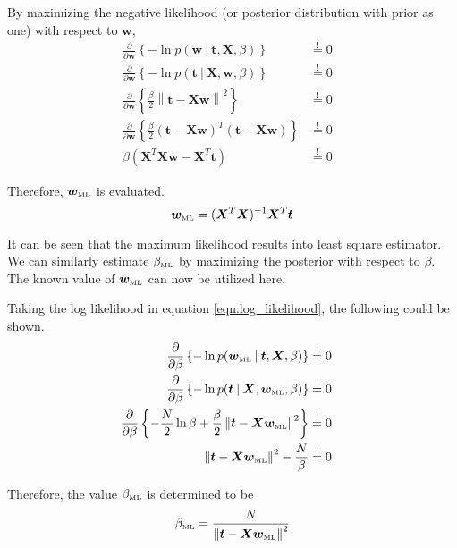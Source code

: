 \documentclass[11pt]{article}
\newcommand{\mle}[1]{{#1}_{\text{\tiny ML}}}
\newcommand\given[1][]{\:#1\vert\:}
\newcommand{\norm}[1]{\left\lVert#1\right\rVert}
\begin{document}
By maximizing the negative likelihood (or posterior distribution with prior as one) with respect to $\bm{w}$,
\begin{eqnarray}
    \frac{\partial }{\partial  \bm{w}} \left\{ -\ln{p(\bm{w} \given \bm{t}, \bm{X}, \beta)} \right\} 
    &\overset{!}{=} 0& \\
    \frac{\partial }{\partial  \bm{w}} \left\{ -\ln{p(\bm{t} \given \bm{X}, \bm{w}, \beta)} \right\} 
    &\overset{!}{=} 0& \\
    \frac{\partial }{\partial \bm{w}} \left\{\frac{\beta}{2} \norm{\bm{t} - \bm{Xw}}^2  \right\}
    &\overset{!}{=} 0& \\
    \frac{\partial }{\partial \bm{w}} \left\{\frac{\beta}{2} \left(\bm{t} - \bm{X}\bm{w}\right)^T \left(\bm{t} - \bm{X}\bm{w}\right) \right\}
    &\overset{!}{=} 0& \\
    \beta \left( \bm{X}^T\bm{X}\bm{w} - \bm{X}^T \bm{t} \right) 
    &\overset{!}{=} 0& 
\end{eqnarray}

Therefore, $\mle{\bm{w}}$ is evaluated.
\begin{equation} \label{eqn:w_ML}
    \mle{\bm{w}} = (\bm{X}^T \bm{X})^{-1} \bm{X}^T \bm{t}
\end{equation}

It can be seen that the maximum likelihood results into least square estimator. We can similarly estimate $\mle{\beta}$ by maximizing the posterior with respect to $\beta$. The known value of $\mle{\bm{w}}$ can now be utilized here.

Taking the log likelihood in equation \ref{eqn:log_likelihood}, the following could be shown.
\begin{eqnarray}
    \frac{\partial }{\partial  \beta} \left\{ -\ln{p(\mle{\bm{w}} \given \bm{t}, \bm{X}, \beta)} \right\} 
    &\overset{!}{=} 0& \\
    \frac{\partial }{\partial  \beta} \left\{ -\ln{p(\bm{t} \given \bm{X}, \mle{\bm{w}}, \beta)} \right\} 
    &\overset{!}{=} 0& \\
    \frac{\partial }{\partial \beta} \left\{-\frac{N}{2}\ln{\beta} + \frac{\beta}{2} \norm{\bm{t} - \bm{X}\mle{\bm{w}}}^2  \right\}
    &\overset{!}{=} 0& \\
    \norm{\bm{t} - \bm{X} \mle{\bm{w}}}^2 - \frac{N}{\beta}
    &\overset{!}{=} 0& 
\end{eqnarray}

Therefore, the value $\mle{\beta}$ is determined to be 
\begin{equation} \label{eqn:beta_ML}
    \mle{\beta} = \frac{N}{\norm{\bm{t} - \bm{X}\mle{\bm{w}}}^2}
\end{equation}
\end{document}
